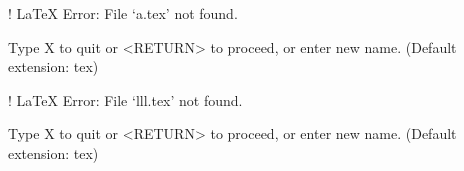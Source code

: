 
! LaTeX Error: File `a.tex' not found.

Type X to quit or <RETURN> to proceed,
or enter new name. (Default extension: tex)


! LaTeX Error: File `lll.tex' not found.

Type X to quit or <RETURN> to proceed,
or enter new name. (Default extension: tex)

